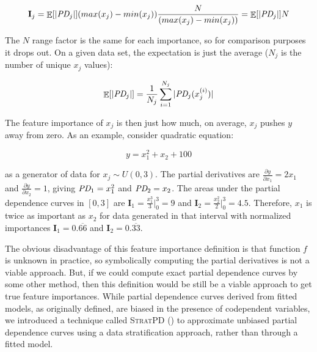 \documentclass[12pt]{article}
\newcommand{\todo}[1]{{{\color{red}{[#1]}}}}
\newcommand{\Ex}{\mathop{\mathbb{E}}}
\newcommand{\Imp}{\mathbf{I}}
\newcommand{\spd}{\fontfamily{cmr}\textsc{\small StratPD}}
\begin{document}
\[
\Imp_j = \Ex[|\text{\it PD}_j|] (max(x_j) -min(x_j)) \frac{N}{(max(x_j) -min(x_j))} = \Ex[|\text{\it PD}_j|] N
\]

\todo{say we normalized so they are comparable; normalized to N not arbitrary $x_j$ range, or just say that we normalize to 0..1 without loss of generality; same as multiplying by that factor}

\noindent The $N$ range factor is the same for each importance, so for comparison purposes it drops out.  On a given data set, the expectation is just the average ($N_j$ is the number of unique $x_j$ values):

\begin{equation}\label{eq:Epd}
\Ex[|\text{\it PD}_j|] = \frac{1}{N_j} \sum_{i=1}^{N_j} |\text{\it PD}_j(x_j^{(i)})|
\end{equation}

\noindent The feature importance of $x_j$ is then just how much, on average, $x_j$ pushes $y$ away from zero.   As an example, consider quadratic equation:

\begin{equation}\label{eq:quad}
y = x_1^2 + x_2 + 100
\end{equation}

\noindent as a generator of data for $x_j \sim U(0,3)$. The partial derivatives are $\frac{\partial y}{\partial x_1} = 2 x_1$ and $\frac{\partial y}{\partial x_2} = 1$, giving $\text{\it PD}_1 = x_1^2$ and $\text{\it PD}_2 = x_2$. The areas under the partial dependence curves in $[0,3]$ are $\Imp_1 = \frac{x_1^3}{3} \big |_0^3 = 9$ and $\Imp_2 = \frac{x_2^2}{2} \big |_0^3 = 4.5$.   Therefore, $x_1$ is twice as important as $x_2$ for data generated in that interval with normalized importances $\Imp_1 = 0.\overline{66}$ and $\Imp_2 = 0.\overline{33}$.

The obvious disadvantage of this feature importance definition is that function $f$ is unknown in practice, so symbolically computing the partial derivatives is not a viable approach. But, if we could compute exact partial dependence curves by some other method, then this definition would be still be a viable approach to get true feature importances. While partial dependence curves derived from fitted models, as originally defined, are biased in the presence of codependent variables, we introduced a technique called \spd{} (\cite{stratpd}) to approximate unbiased partial dependence curves using a data stratification approach, rather than through a fitted model. \todo{In a nutshell, \spd{} ...}
\end{document}
